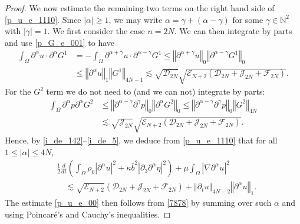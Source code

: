 \documentclass[a4paper,reqno,11pt]{amsart}
\numberwithin{equation}{section}
\providecommand{\abs}[1]{\left\vert#1\right\vert}
\providecommand{\norm}[1]{\left\Vert#1\right\Vert}
\providecommand{\sd}[1]{\mathcal{D}_{#1}}
\providecommand{\se}[1]{\mathcal{E}_{#1}}
\providecommand{\norm}[1]{\left\Vert#1\right\Vert}
\begin{document}
\begin{proof}
We now estimate the remaining two terms on the right hand side of \eqref{p_u_e_1110}. Since $\abs{\alpha}\ge 1$, we may write $\alpha = \gamma +(\alpha-\gamma)$ for some $\gamma \in \mathbb{N}^2$ with $\abs{\gamma}=1$. We first consider the case $n=2N$. We can then integrate by parts and use \eqref{p_G_e_001} to have
\begin{equation}\label{i_de_4}
\begin{split}
  \int_\Omega     {\partial}^{\alpha}   u \cdot   {\partial}^{\alpha}  G^1  &=- \int_\Omega     {\partial}^{\alpha+\gamma}   u \cdot   {\partial}^{\alpha-\gamma}  G^1
 \le \norm{{\partial}^{\alpha+\gamma}   u}_{0}  \norm{ {\partial}^{\alpha-\gamma}   G^1 }_{0} \\&
\le \norm{{\partial}^{\alpha}   u}_{1}  \norm{    G^1 }_{4N-1 }
{\lesssim} \sqrt{ \sd{2N} } \sqrt{ \se{N+2}(\sd{2N}+\mathcal{J}_{2N} +{\mathcal{F}_{2N}})  } .
\end{split}
\end{equation}
For the $G^2$ term we do not need to (and we can not) integrate by parts:
\begin{equation}\label{i_de_5}
\begin{split}
  \int_\Omega  {\partial}^{\alpha}   p {\partial}^{\alpha}  G^2
&\le \norm{{\partial}^{\alpha-\gamma}{\partial}^\gamma  p}_{0}  \norm{ {\partial}^{\alpha} G^2 }_{0}
\le \norm{{\partial}^{\alpha-\gamma}{\partial}^\gamma p}_{0}  \norm{    G^2 }_{4N}
  \\&{\lesssim} \sqrt{\mathcal{J}_{2N} }\sqrt{ \se{N+2}(\sd{2N}+\mathcal{J}_{2N} +{\mathcal{F}_{2N}})  } .
\end{split}
\end{equation}
Hence, by \eqref{i_de_142}--\eqref{i_de_5}, we deduce from \eqref{p_u_e_1110} that for all $1\le \abs{\alpha} \le 4N$,
\begin{equation} \label{7878}
\begin{split}
 &{\frac{1}{2}} \frac{d}{dt}\left(  \int_\Omega \rho_0 \abs{{\partial}^{\alpha}  u }^2  + \kappa\bar b^2\abs{{\partial}_3\partial^\alpha  \eta }^2\right)+   \mu\int_\Omega  \abs{\nabla {\partial}^{\alpha} u }^2
 \\&\quad{\lesssim}  \sqrt{ \se{N+2}  } ( \sd{2N}+\mathcal{J}_{2N} +{\mathcal{F}_{2N}})+\norm{{\partial_t} u}_{4N-2}\norm{{\partial}^{\alpha}   u}_{1}.
\end{split}
\end{equation}
The estimate \eqref{p_u_e_00} then follows from \eqref{7878} by summing over such $\alpha$ and using Poincar\'e's and Cauchy's inequalities.


\end{proof}
\end{document}

